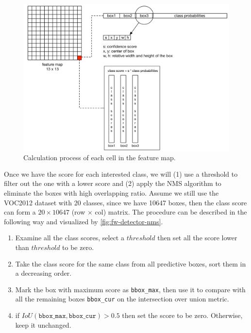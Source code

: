 \begin{figure}
    \includegraphics[width=\linewidth]{figures/framework_detector_calc.png}
    \caption{Calculation process of each cell in the feature map.}
    \label{fig:fw-detector-calc}
\end{figure}

Once we have the score for each interested class, we will (1) use a threshold to
filter out the one with a lower score and (2) apply the NMS algorithm to
eliminate the boxes with high overlapping ratio. Assume we still use the
VOC2012 dataset with 20 classes, since we have 10647 boxes, then the class score
can form a $20 \times 10647$ (row $\times$ col) matrix. The procedure can be
described in the following way and visualized by \autoref{fig:fw-detector-nms}.

\begin{enumerate}
    \item Examine all the class scores, select a $threshold$ then set all the
    score lower than $threshold$ to be zero.
    \item Take the class score for the same class from all predictive boxes,
    sort them in a decreasing order.
    \item Mark the box with maximum score as \texttt{bbox\_max}, then use it to
    compare with all the remaining boxes \texttt{bbox\_cur} on the intersection
    over union metric.
    \item if $IoU(\texttt{bbox\_max}, \texttt{bbox\_cur}) > 0.5$ then set the
    score to be zero. Otherwise, keep it unchanged.
\end{enumerate}

